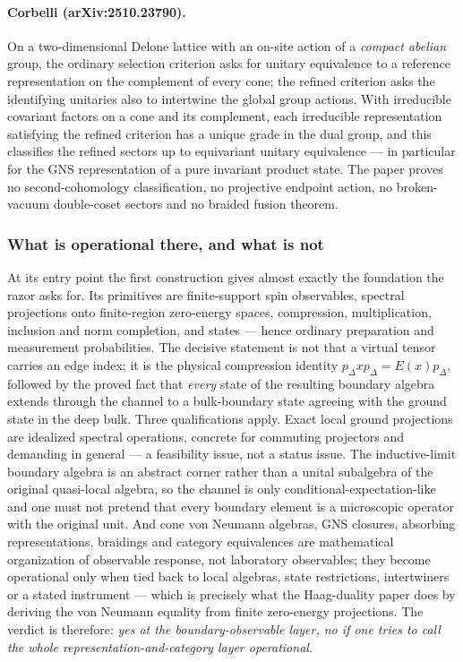 \paragraph{Corbelli (arXiv:2510.23790).} On a two-dimensional Delone lattice
with an on-site action of a \emph{compact abelian} group, the ordinary
selection criterion asks for unitary equivalence to a reference representation
on the complement of every cone; the refined criterion asks the identifying
unitaries also to intertwine the global group actions. With irreducible
covariant factors on a cone and its complement, each irreducible representation
satisfying the refined criterion has a unique grade in the dual group, and this
classifies the refined sectors up to equivariant unitary equivalence --- in
particular for the GNS representation of a pure invariant product state. The
paper proves no second-cohomology classification, no projective endpoint
action, no broken-vacuum double-coset sectors and no braided fusion theorem.

\subsubsection*{What is operational there, and what is not}

At its entry point the first construction gives almost exactly the foundation
the razor asks for. Its primitives are finite-support spin observables,
spectral projections onto finite-region zero-energy spaces, compression,
multiplication, inclusion and norm completion, and states --- hence ordinary
preparation and measurement probabilities. The decisive statement is not that
a virtual tensor carries an edge index; it is the physical compression identity
$p_\Delta x p_\Delta = E(x)p_\Delta$, followed by the proved fact that
\emph{every} state of the resulting boundary algebra extends through the
channel to a bulk-boundary state agreeing with the ground state in the deep
bulk. Three qualifications apply. Exact local ground projections are idealized
spectral operations, concrete for commuting projectors and demanding in
general --- a feasibility issue, not a status issue. The inductive-limit
boundary algebra is an abstract corner rather than a unital subalgebra of the
original quasi-local algebra, so the channel is only
conditional-expectation-like and one must not pretend that every boundary
element is a microscopic operator with the original unit. And cone von Neumann
algebras, GNS closures, absorbing representations, braidings and category
equivalences are mathematical organization of observable response, not
laboratory observables; they become operational only when tied back to local
algebras, state restrictions, intertwiners or a stated instrument --- which is
precisely what the Haag-duality paper does by deriving the von Neumann equality
from finite zero-energy projections. The verdict is therefore: \emph{yes at the
boundary-observable layer, no if one tries to call the whole
representation-and-category layer operational}.

